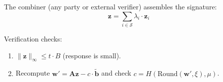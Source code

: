 The combiner (any party or external verifier) assembles the signature:
\[
\mathbf{z} = \sum_{i \in \mathcal{S}} \lambda_i \cdot \mathbf{z}_i
\]

Verification checks:
\begin{enumerate}[nosep]
\item $\|\mathbf{z}\|_\infty \leq t \cdot B$ (response is small).
\item Recompute $\mathbf{w}' = \mathbf{A}\mathbf{z} - c \cdot \tilde{\mathbf{b}}$ and check
$c = H(\text{Round}(\mathbf{w}', \xi), \mu)$.
\end{enumerate}

